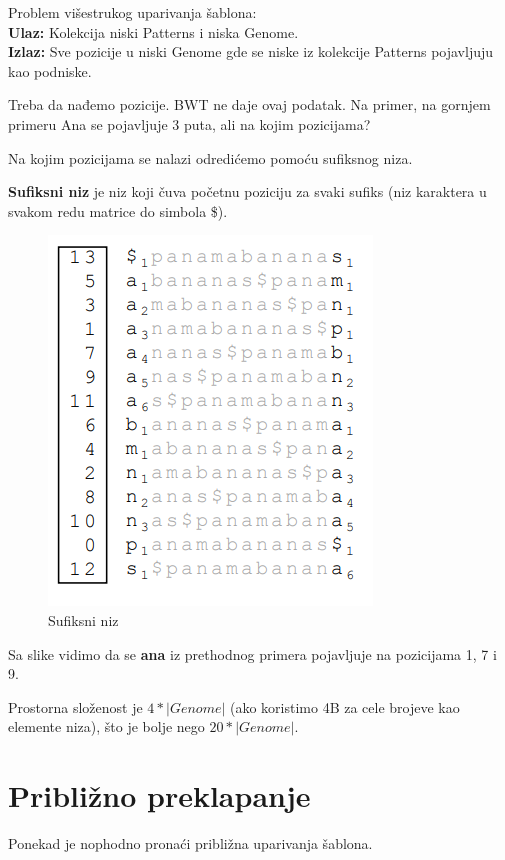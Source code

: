 Problem višestrukog uparivanja šablona:\\
\textbf{Ulaz:} Kolekcija niski Patterns i niska Genome.\\
\textbf{Izlaz:} Sve pozicije u niski Genome gde se niske iz kolekcije Patterns pojavljuju kao podniske.

Treba da nađemo pozicije. BWT ne daje ovaj podatak. Na primer, na gornjem primeru Ana se pojavljuje 3 puta, ali na kojim pozicijama?

Na kojim pozicijama se nalazi odredićemo pomoću sufiksnog niza.

\textbf{Sufiksni niz} je niz koji čuva početnu poziciju za svaki sufiks (niz karaktera u svakom redu matrice do simbola \$).


\begin{figure}[h!]
\centering
\includegraphics[scale=0.75]{poglavlja/9/slike/sufiksniNiz.png}
\caption{Sufiksni niz}
\label{slika:X}
\end{figure}

\newpage

Sa slike vidimo da se \textbf{ana} iz prethodnog primera pojavljuje na pozicijama 1, 7 i 9.

Prostorna složenost je $4 * |Genome|$ (ako koristimo 4B za cele brojeve kao elemente niza), što je bolje nego $20 * |Genome|$.

\section{Približno preklapanje}

Ponekad je nophodno pronaći približna uparivanja šablona.

